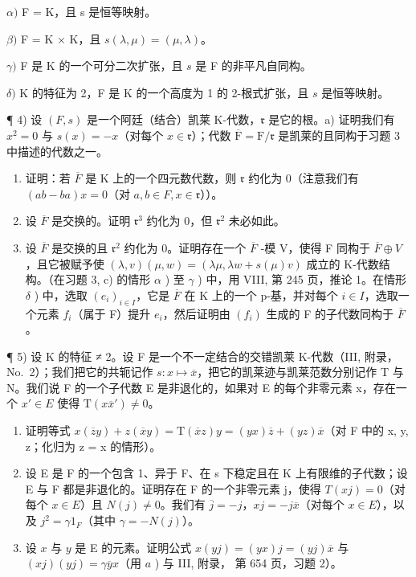 \(\alpha)\) F = K，且 s 是恒等映射。

\(\beta)\) F = K × K，且 \(s(\lambda, \mu) = (\mu, \lambda)\)。

\(\gamma)\) F 是 K 的一个可分二次扩张，且 \(s\) 是 F 的非平凡自同构。

\(\delta)\) K 的特征为 2，F 是 K 的一个高度为 1 的 2-根式扩张，且 \(s\) 是恒等映射。

¶ 4) 设 \((F, s)\) 是一个阿廷（结合）凯莱 K-代数，\(\mathfrak{r}\) 是它的根。a) 证明我们有 \(x^{2} = 0\) 与 \(s(x) = -x\)（对每个 \(x \in \mathfrak{r}\)）；代数 \(\overline{\mathrm{F}} = \mathrm{F} / \mathfrak{r}\) 是凯莱的且同构于习题 3 中描述的代数之一。

\begin{enumerate}
\def\labelenumi{\alph{enumi})}
\setcounter{enumi}{1}
\item
  证明：若 \(\overline{F}\) 是 K 上的一个四元数代数，则 \(\mathfrak{r}\) 约化为 0（注意我们有 \((ab - ba)x = 0\)（对 \(a, b \in F, x \in \mathfrak{r}\)））。
\item
  设 \(\overline{F}\) 是交换的。证明 \(\mathfrak{r}^{3}\) 约化为 0，但 \(\mathfrak{r}^{2}\) 未必如此。
\item
  设 \(\overline{F}\) 是交换的且 \(\mathfrak{r}^{2}\) 约化为 0。证明存在一个 \(\overline{F}\) -模 V，使得 F 同构于 \(\overline{F} \oplus V\)，且它被赋予使 \((\lambda, v)(\mu, w) = (\lambda \mu, \lambda w + s(\mu) v)\) 成立的 K-代数结构。（在习题 3, c) 的情形 \(\alpha\) ) 至 \(\gamma\) ) 中，用 VIII, 第 245 页，推论 1。在情形 \(\delta\) ) 中，选取 \((e_{i})_{i \in I}\)，它是 \(\overline{F}\) 在 K 上的一个 p-基，并对每个 \(i \in I\)，选取一个元素 \(f_{i}\)（属于 F）提升 \(e_{i}\)，然后证明由 \((f_{i})\) 生成的 F 的子代数同构于 \(\overline{F}\)。
\end{enumerate}

¶ 5) 设 K 的特征 ≠ 2。设 F 是一个不一定结合的交错凯莱 K-代数（III, 附录， No.~2）；我们把它的共轭记作 \(s : x \mapsto \overline{x}\)，把它的凯莱迹与凯莱范数分别记作 T 与 N。我们说 F 的一个子代数 E 是非退化的，如果对 E 的每个非零元素 x，存在一个 \(x' \in E\) 使得 \(\mathrm{T}(x\overline{x}') \neq 0\)。

\begin{enumerate}
\def\labelenumi{\alph{enumi})}
\item
  证明等式 \(x(\overline{z}y) + z(\overline{x}y) = \mathrm{T}(\overline{x}z)y = (yx)\overline{z} + (yz)\overline{x}\)（对 F 中的 x, y, z；化归为 z = x 的情形）。
\item
  设 E 是 F 的一个包含 1、异于 F、在 s 下稳定且在 K 上有限维的子代数；设 E 与 F 都是非退化的。证明存在 F 的一个非零元素 j，使得 \(T(xj) = 0\)（对每个 \(x \in E\)）且 \(N(j) \neq 0\)。我们有 \(\overline{j} = -j\)，\(xj = -j\overline{x}\)（对每个 \(x \in E\)），以及 \(j^{2} = \gamma1_{F}\)（其中 \(\gamma = -N(j)\)）。
\item
  设 \(x\) 与 \(y\) 是 E 的元素。证明公式 \(x(yj) = (yx)j = (yj)\overline{x}\) 与 \((xj)(yj) = \gamma \overline{y}x\)（用 \(a\) ) 与 III, 附录， 第 654 页，习题 2）。
\end{enumerate}

